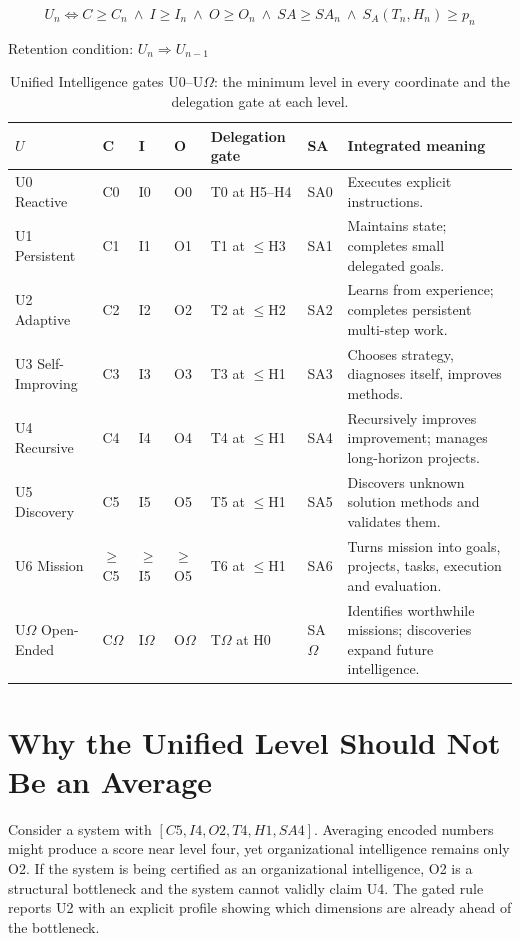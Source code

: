 \documentclass[11pt]{article}
\theoremstyle{definition}
\newcommand{\Om}{\ensuremath{\Omega}}
\begin{document}
\begin{equation}
U_n \iff C \ge C_n \ \wedge\ I \ge I_n \ \wedge\ O \ge O_n \ \wedge\ SA \ge SA_n \ \wedge\ S_A(T_n,H_n) \ge p_n
\end{equation}
\begin{center}Retention condition: $U_n \Rightarrow U_{n-1}$\end{center}

\begin{table}[!htbp]
\centering\small
\begin{tabularx}{\textwidth}{@{}llllllY@{}}
\toprule
$U$ & C & I & O & Delegation gate & SA & Integrated meaning \\
\midrule
U0 Reactive & C0 & I0 & O0 & T0 at H5--H4 & SA0 & Executes explicit instructions. \\
U1 Persistent & C1 & I1 & O1 & T1 at $\le$H3 & SA1 & Maintains state; completes small delegated goals. \\
U2 Adaptive & C2 & I2 & O2 & T2 at $\le$H2 & SA2 & Learns from experience; completes persistent multi-step work. \\
U3 Self-Improving & C3 & I3 & O3 & T3 at $\le$H1 & SA3 & Chooses strategy, diagnoses itself, improves methods. \\
U4 Recursive & C4 & I4 & O4 & T4 at $\le$H1 & SA4 & Recursively improves improvement; manages long-horizon projects. \\
U5 Discovery & C5 & I5 & O5 & T5 at $\le$H1 & SA5 & Discovers unknown solution methods and validates them. \\
U6 Mission & $\ge$C5 & $\ge$I5 & $\ge$O5 & T6 at $\le$H1 & SA6 & Turns mission into goals, projects, tasks, execution and evaluation. \\
U\Om{} Open-Ended & C\Om{} & I\Om{} & O\Om{} & T\Om{} at H0 & SA\Om{} & Identifies worthwhile missions; discoveries expand future intelligence. \\
\bottomrule
\end{tabularx}
\caption{Unified Intelligence gates U0--U\Om{}: the minimum level in every coordinate and the delegation gate at each level.}
\label{tab:ugates}
\end{table}

\section{Why the Unified Level Should Not Be an Average}

Consider a system with $[C5, I4, O2, T4, H1, SA4]$. Averaging encoded numbers might produce a score near level four, yet organizational intelligence remains only O2. If the system is being certified as an organizational intelligence, O2 is a structural bottleneck and the system cannot validly claim U4. The gated rule reports U2 with an explicit profile showing which dimensions are already ahead of the bottleneck.
\end{document}
